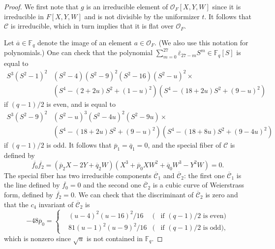 \documentclass{amsart}
\theoremstyle{definition}
\theoremstyle{remark}
\newcommand{\Fq}{\mathbb F_q}
\begin{document}
\begin{proof}
We first note that $g$ is an irreducible element of $\mathcal{O}_F[X, Y, W]$ since it is irreducible in $F[X, Y, W]$ and is not divisible by the uniformizer $t$.
It follows that $\mathscr{C}$ is irreducible, which in turn implies that it is flat over $\mathcal{O}_F$.

Let $\overline{a} \in \Fq$ denote the image of an element $a \in \mathcal{O}_F$.
(We also use this notation for polynomials.)
One can check that the polynomial
$\sum^{27}_{m=0} \overline{\varepsilon}_{27-m} S^{m} \in \Fq[S]$
is equal to
\begin{equation}\label{equation:even case}
    \begin{aligned}
    S^3(S^2-1)^2&(S^2-4)(S^2-9)^2(S^2-16)(S^2-u)^2 \times \\ &(S^4-(2+2u)S^2+(1-u)^2)(S^4-(18+2u)S^2+(9-u)^2)
    \end{aligned}
\end{equation}
if $(q-1)/2$ is even, and is equal to
\begin{equation}\label{equation:odd case}
    \begin{aligned}
    S^3(S^2-9)^2&(S^2-u)^3(S^2-4u)^2(S^2-9u) \times \\ &(S^4-(18+2u)S^2+(9-u)^2)(S^4-(18+8u)S^2+(9-4u)^2)
    \end{aligned}
\end{equation}
if $(q-1)/2$ is odd.
It follows that $\overline{p}_1=\overline{q}_1=0$,
and the special fiber of $\mathscr{C}$ is defined by
\[
\overline{f_0}\overline{f_2}=(\overline{p}_2 X - 2Y + \overline{q}_2 W)(X^3 +\overline{p}_0 XW^2 + \overline{q}_0 W^3 - Y^2W)=0.
\]
The special fiber has two irreducible components $\overline{\mathscr{C}}_1$ and $\overline{\mathscr{C}}_2$: the first one $\overline{\mathscr{C}}_1$ is the line defined by
$\overline{f_0}=0$
and the second one $\overline{\mathscr{C}}_2$ is a cubic curve of Weierstrass form, defined by $\overline{f_2}=0$.
We can check that
the discriminant of $\overline{\mathscr{C}}_2$
is zero and that
the $c_4$ invariant of $\overline{\mathscr{C}}_2$
is
\begin{equation}\label{equation:c4 invariant}
    -48\overline{p}_0=
\left\{
  \begin{aligned}
  & (u-4)^2(u-16)^2/16 &  (& \text{if $(q-1)/2$ is even})\\
  & 81(u-1)^2(u-9)^2/16 &  (& \text{if $(q-1)/2$ is odd}),
  \end{aligned}
\right.
\end{equation}
which is nonzero since $\sqrt{u}$ is not contained in $\Fq$.

\end{proof}
\end{document}
